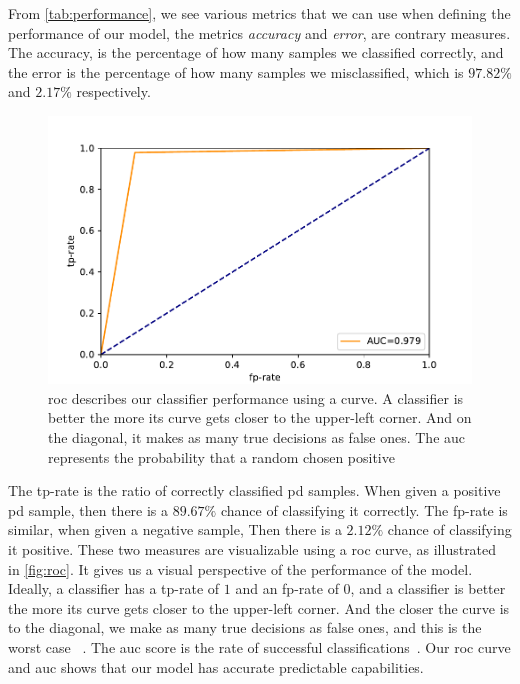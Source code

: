 

From \autoref{tab:performance}, we see various metrics that we can use when defining the performance of our model, the metrics \emph{accuracy} and \emph{error}, are contrary measures. The accuracy, is the percentage of how many samples we classified correctly, and the error is the percentage of how many samples we misclassified, which is $97.82\%$ and $2.17\%$ respectively.

\begin{figure}[ht]
    \centering
    \includegraphics[width=\textwidth]{results/roc.pdf}
    \caption[\project's \acl{roc} curve]{\acl{roc} describes our classifier performance using a curve. A classifier is better the more its curve gets closer to the upper-left corner. And on the diagonal, it makes as many true decisions as false ones. The \acl{auc} represents the probability that a random chosen positive }
    \label{fig:roc}
\end{figure} 

The tp-rate is the ratio of correctly classified \ac{pd} samples. When given a positive \ac{pd} sample, then there is a $89.67\%$ chance of classifying it correctly. The fp-rate is similar, when given a negative sample, Then there is a $2.12\%$ chance of classifying it positive. These two measures are visualizable using a \ac{roc} curve, as illustrated in \autoref{fig:roc}. It gives us a visual perspective of the performance of the model. Ideally, a classifier has a tp-rate of $1$ and an fp-rate of $0$, and a classifier is better the more its curve gets closer to the upper-left corner. And the closer the curve is to the diagonal, we make as many true decisions as false ones, and this is the worst case ~\cite[p.~563]{alpaydin2014introduction}. The \ac{auc} score is the rate of successful classifications~\cite{bradley1997use}. Our \ac{roc} curve and \ac{auc} shows that our model has accurate predictable capabilities.

